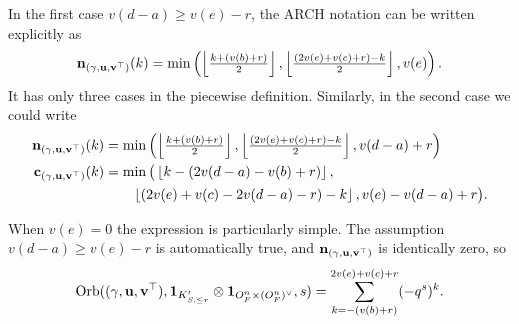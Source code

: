 \begin{remark}
  In the first case $v(d-a) \ge v(e) - r$,
  the ARCH notation can be written explicitly as
  \[ \mathbf n_{(\gamma, \mathbf u, \mathbf v^\top)}(k) = \min\left( \left\lfloor \tfrac{k + (v(b)+r)}{2} \right\rfloor,
    \left\lfloor \tfrac{(2v(e)+v(c)+r)-k}{2} \right\rfloor, v(e) \right). \]
  It has only three cases in the piecewise definition.
  Similarly, in the second case we could write
  \begin{align*}
    \mathbf n_{(\gamma, \mathbf u, \mathbf v^\top)}(k) &= \min\left( \left\lfloor \tfrac{k + (v(b)+r)}{2} \right\rfloor,
      \left\lfloor \tfrac{(2v(e)+v(c)+r)-k}{2} \right\rfloor, v(d-a)+r \right) \\
    \mathbf c_{(\gamma, \mathbf u, \mathbf v^\top)}(k) &= \min\big( \left\lfloor k - (2v(d-a)-v(b)+r) \right\rfloor, \\
      &\qquad \left\lfloor(2v(e)+v(c)-2v(d-a)-r)-k \right\rfloor, v(e)-v(d-a)+r \big).
  \end{align*}
\end{remark}

\begin{example}
  When $v(e) = 0$ the expression is particularly simple.
  The assumption $v(d-a) \ge v(e)-r$ is automatically true, and
  $\mathbf n_{{(\gamma, \mathbf u, \mathbf v^\top)}}$ is identically zero, so
  \[ \operatorname{Orb}({(\gamma, \mathbf u, \mathbf v^\top)}, \mathbf{1}_{K'_{S, \le r}} \otimes \mathbf{1}_{O_F^n \times (O_F^n)^\vee}, s)
    = \sum_{k=-(v(b)+r)}^{2v(e)+v(c)+r} (-q^s)^k. \]
\end{example}

